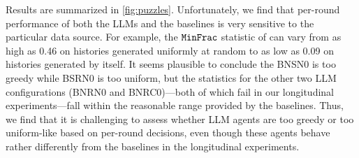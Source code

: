 Results are summarized in \cref{fig:puzzles}.  Unfortunately, we
find that per-round performance of both the LLMs and the baselines is very
sensitive to the particular data source. For example, the $\texttt{MinFrac}$
statistic of \ucb can vary from as high as 0.46 on histories generated
uniformly at random to as low as 0.09 on histories generated by \ucb
itself. It seems plausible to conclude the BNSN0 is too greedy while
BSRN0 is too uniform, but the statistics for the other two LLM
configurations (BNRN0 and BNRC0)---both of which fail in our
longitudinal experiments---fall within the reasonable range provided
by the baselines.  Thus, we find that it is challenging to assess whether
LLM agents are too greedy or too uniform-like based on per-round
decisions, even though these agents behave rather differently from the
baselines in the longitudinal experiments.














